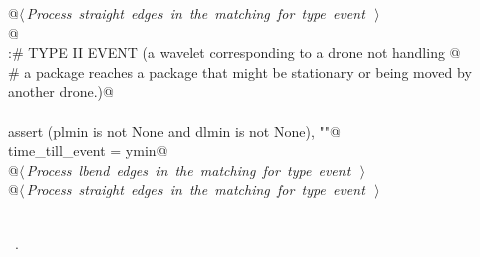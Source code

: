 \documentclass[10pt, english, oneside]{report}
\begin{document}
\begin{flushleft}
\begin{minipage}{\linewidth}
\begin{list}{}{}
\mbox{}\verb@    @\hbox{$\langle\,${\itshape Process straight edges in the matching for type  event}\nobreak\ {\footnotesize {}}$\,\rangle$}\verb@@\\
\mbox{}\verb@    @\\
\mbox{}\verb@else:# TYPE II EVENT (a wavelet corresponding to a drone not handling @\\
\mbox{}\verb@     # a package reaches a package that might be stationary or being moved by another drone.)@\\
\mbox{}\verb@@\\
\mbox{}\verb@    assert (plmin is not None and dlmin is not None), ""@\\
\mbox{}\verb@    time_till_event = ymin@\\
\mbox{}\verb@    @\hbox{$\langle\,${\itshape Process lbend edges in the matching for type  event}\nobreak\ {\footnotesize {}}$\,\rangle$}\verb@@\\
\mbox{}\verb@    @\hbox{$\langle\,${\itshape Process straight edges in the matching for type  event}\nobreak\ {\footnotesize {}}$\,\rangle$}\verb@@\\
\mbox{}\verb@return@\\
\mbox{}\verb@@{\NWsep}
\end{list}
\vspace{-1.5ex}
\footnotesize
\begin{list}{}{\setlength{\itemsep}{-\parsep}\setlength{\itemindent}{-\leftmargin}}
\item \NWtxtMacroRefIn\ .

\item{}
\end{list}
\end{minipage}\vspace{4ex}
\end{flushleft}
\end{document}
